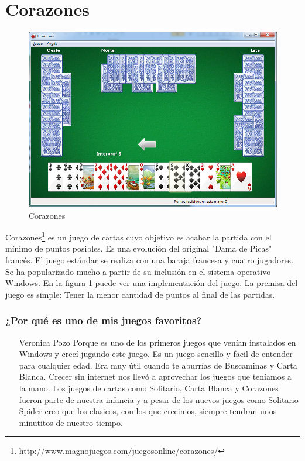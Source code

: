 \section{Corazones}

\begin{figure}[htbp]
\begin{center}
\includegraphics[width=.60\textwidth]{./imagenes/Corazones.png}
\caption{Corazones}
\label{Corazones}
\end{center}
\end{figure}
Corazones\footnote{\url{http://www.magnojuegos.com/juegosonline/corazones/}} es un juego de cartas cuyo objetivo es acabar la partida con el mínimo de puntos posibles. Es una evolución del original "Dama de Picas" francés. El juego estándar se realiza con una baraja francesa y cuatro jugadores. Se ha popularizado mucho a partir de su inclusión en el sistema operativo Windows.
En la figura \ref{Corazones} puede ver una implementación del juego.
La premisa del juego es simple: Tener la menor cantidad de puntos al final de las partidas.

\subsubsection{¿Por qué es uno de mis juegos favoritos?}
\begin{itemize}
\item[Veronica Pozo] Porque es uno de los primeros juegos que venían instalados en Windows y crecí jugando este juego. Es un juego sencillo y facil de entender para cualquier edad. Era muy útil cuando te aburrías de Buscaminas y Carta Blanca. Crecer sin internet nos llevó a aprovechar los juegos que teníamos a la mano. Los juegos de cartas como Solitario, Carta Blanca y Corazones fueron parte de nuestra infancia y a pesar de los nuevos juegos como Solitario Spider creo que los clasicos, con los que crecimos, siempre tendran unos minutitos de nuestro tiempo.
\end{itemize}
